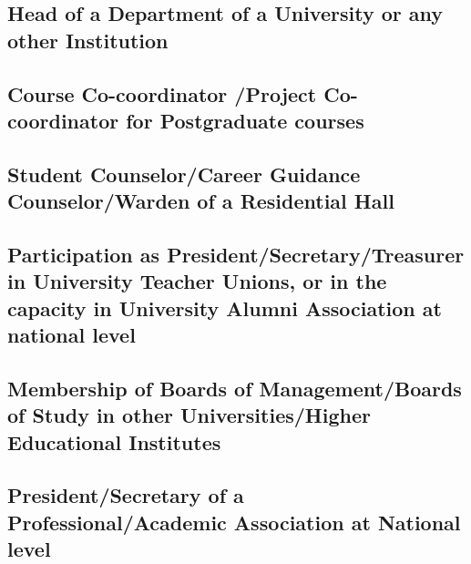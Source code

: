 	
	\subsection{Head of a Department of a University or any other Institution  }
		\label{HOD}
		
	
	\subsection{Course Co-coordinator /Project Co-coordinator for Postgraduate   courses}
		
		
	
	\subsection{Student Counselor/Career Guidance Counselor/Warden of a Residential Hall   }
		
		
	
	\subsection{Participation as President/Secretary/Treasurer in University  Teacher Unions, or  in the capacity in University Alumni Association at national level }
		
	
	
	\subsection{Membership of Boards of Management/Boards of Study in other Universities/Higher Educational Institutes  }
		
	
	
	\subsection{President/Secretary of a Professional/Academic  Association at National level }
		\label{Alumni}
	
	
	
	
	
	



